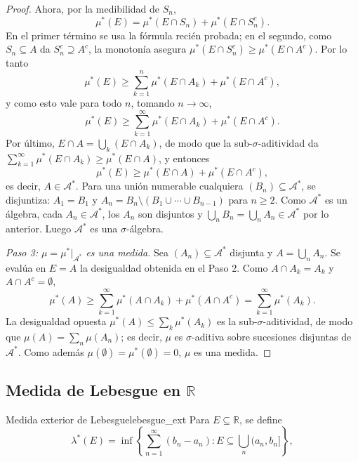 \documentclass[11pt, a4paper]{article}
\begin{document}
\begin{proof}
Ahora, por la medibilidad de $S_n$,
$$ \mu^*(E) = \mu^*(E \cap S_n) + \mu^*(E \cap S_n^c). $$
En el primer término se usa la fórmula recién probada; en el segundo, como $S_n \subseteq A$ da $S_n^c \supseteq A^c$, la monotonía asegura $\mu^*(E \cap S_n^c) \ge \mu^*(E \cap A^c)$. Por lo tanto
$$ \mu^*(E) \ge \sum_{k=1}^n \mu^*(E \cap A_k) + \mu^*(E \cap A^c), $$
y como esto vale para todo $n$, tomando $n \to \infty$,
$$ \mu^*(E) \ge \sum_{k=1}^\infty \mu^*(E \cap A_k) + \mu^*(E \cap A^c). $$
Por último, $E \cap A = \bigcup_k (E \cap A_k)$, de modo que la sub-$\sigma$-aditividad da $\sum_{k=1}^\infty \mu^*(E \cap A_k) \ge \mu^*(E \cap A)$, y entonces
$$ \mu^*(E) \ge \mu^*(E \cap A) + \mu^*(E \cap A^c), $$
es decir, $A \in \mathcal{A}^*$. Para una unión numerable cualquiera $(B_n) \subseteq \mathcal{A}^*$, se disjuntiza: $A_1 = B_1$ y $A_n = B_n \setminus (B_1 \cup \cdots \cup B_{n-1})$ para $n \ge 2$. Como $\mathcal{A}^*$ es un álgebra, cada $A_n \in \mathcal{A}^*$, los $A_n$ son disjuntos y $\bigcup_n B_n = \bigcup_n A_n \in \mathcal{A}^*$ por lo anterior. Luego $\mathcal{A}^*$ es una $\sigma$-álgebra.

\textit{Paso 3: $\mu = \mu^*|_{\mathcal{A}^*}$ es una medida.} Sea $(A_n) \subseteq \mathcal{A}^*$ disjunta y $A = \bigcup_n A_n$. Se evalúa en $E = A$ la desigualdad obtenida en el Paso 2. Como $A \cap A_k = A_k$ y $A \cap A^c = \emptyset$,
$$ \mu^*(A) \ge \sum_{k=1}^\infty \mu^*(A \cap A_k) + \mu^*(A \cap A^c) = \sum_{k=1}^\infty \mu^*(A_k). $$
La desigualdad opuesta $\mu^*(A) \le \sum_k \mu^*(A_k)$ es la sub-$\sigma$-aditividad, de modo que $\mu(A) = \sum_n \mu(A_n)$; es decir, $\mu$ es $\sigma$-aditiva sobre sucesiones disjuntas de $\mathcal{A}^*$. Como además $\mu(\emptyset) = \mu^*(\emptyset) = 0$, $\mu$ es una medida.
\end{proof}

\subsection{Medida de Lebesgue en \texorpdfstring{$\mathbb{R}$}{R}}

\begin{definicion}{Medida exterior de Lebesgue}{lebesgue_ext}
Para $E \subseteq \mathbb{R}$, se define
$$ \lambda^*(E) = \inf\!\left\{ \sum_{n=1}^\infty (b_n - a_n) : E \subseteq \bigcup_n (a_n, b_n]
\right\}, $$
\end{definicion}
\end{document}
